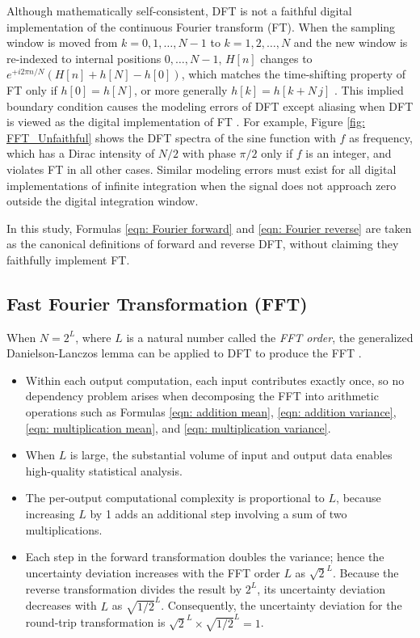 \documentclass[twoside]{article}
\numberwithin{equation}{section}
\newcommand{\Verbose}{}
\begin{document}
Although mathematically self-consistent, DFT is not a faithful digital implementation of the continuous Fourier transform (FT).
When the sampling window is moved from $k = 0,1,\dots,N-1$ to $k = 1,2,\dots,N$ and the new window is re-indexed to internal positions $0,\dots,N-1$, $H[n]$ changes to $e^{+i 2\pi n / N}(H[n] + h[N] - h[0])$, which matches the time-shifting property of FT \cite{Numerical_Recipes} only if $h[0] = h[N]$, or more generally $h[k] = h[k + N\,j]$ \cite{Prev_Precision_Arithmetic}.
This implied boundary condition causes the modeling errors of DFT except aliasing when DFT is viewed as the digital implementation of FT \cite{DFT_modeling_errors}.
\ifdefined\Verbose
For example, Figure \ref{fig: FFT_Unfaithful} shows the DFT spectra of the sine function with $f$ as frequency, which has a Dirac intensity of $N/2$ with phase $\pi/2$ only if $f$ is an integer, and violates FT in all other cases.
\fi
Similar modeling errors must exist for all digital implementations of infinite integration when the signal does not approach zero outside the digital integration window.

In this study, Formulas \eqref{eqn: Fourier forward} and \eqref{eqn: Fourier reverse} are taken as the canonical definitions of forward and reverse DFT, without claiming they faithfully implement FT.



\subsection{Fast Fourier Transformation (FFT)}



When $N = 2^{L}$, where $L$ is a natural number called the \emph{FFT order}, the generalized Danielson-Lanczos lemma can be applied to DFT to produce the FFT \cite{Numerical_Recipes}. 
\begin{itemize}

\item Within each output computation, each input contributes exactly once, so no dependency problem arises when decomposing the FFT into arithmetic operations such as Formulas \eqref{eqn: addition mean}, \eqref{eqn: addition variance}, \eqref{eqn: multiplication mean}, and \eqref{eqn: multiplication variance}.

\item When $L$ is large, the substantial volume of input and output data enables high-quality statistical analysis.

\item The  per-output computational complexity is proportional to $L$, because increasing $L$ by 1 adds an additional step involving a sum of two multiplications.

\item Each step in the forward transformation doubles the variance; hence the uncertainty deviation increases with the FFT order $L$ as $\sqrt{2}^L$.
Because the reverse transformation divides the result by $2^L$, its uncertainty deviation decreases with $L$ as $\sqrt{1/2}^L$.
Consequently, the uncertainty deviation for the round-trip transformation is $\sqrt{2}^L \times \sqrt{1/2}^L = 1$.

\end{itemize}
\end{document}
